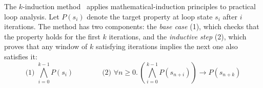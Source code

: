 \documentclass[sigconf]{acmart}
\newcommand{\projName}{HoarePrompt\xspace}
\begin{document}



The $k$-induction method~\cite{donaldson2011software} applies mathematical-induction principles to practical loop analysis. Let $P(s_i)$ denote the target property at loop state $s_i$ after $i$ iterations. The method has two components: the \emph{base case} (1), which checks that the property holds for the first $k$ iterations, and the \emph{inductive step} (2), which proves that any window of $k$ satisfying iterations implies the next one also satisfies it:
\[
\text{(1) }\bigwedge_{i=0}^{k-1} P(s_i)
\qquad\qquad
\text{(2) }\forall n\ge 0.\,\left( \bigwedge_{i=0}^{k-1} P(s_{n+i}) \right) \rightarrow P(s_{n+k})
\]





\end{document}
